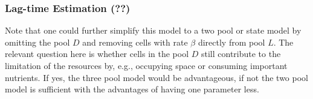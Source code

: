 \documentclass[10pt,A4paper]{article}
\begin{document}

\subsubsection{Lag-time Estimation (??)}

Note that one could further simplify this model to a two pool or state model by omitting the pool $D$ and removing cells with rate $\beta$ directly from pool $L$. 
The relevant question here is whether cells in the pool $D$ still contribute to the limitation of the resources by, e.g., occupying space or consuming important nutrients. 
If yes, the three pool model would be advantageous, if not the two pool model is sufficient with the advantages of having one parameter less.\\
\end{document}
